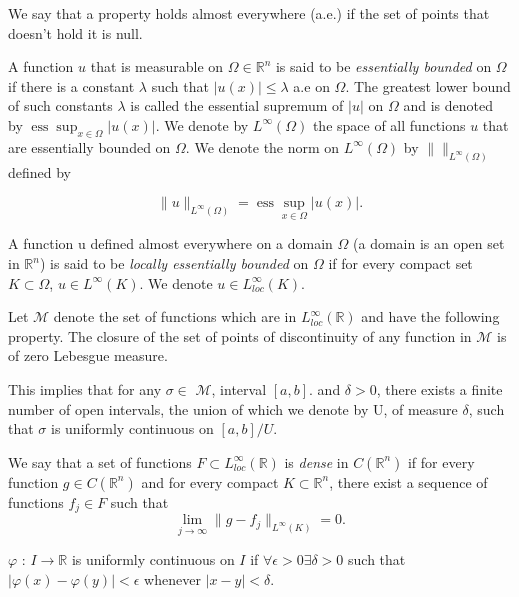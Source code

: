 \documentclass[../main.tex]{subfiles}
\begin{document}
\begin{definition}
	We say that a property holds almost everywhere (a.e.) if the set of points that doesn’t hold it is null.
\end{definition}

\begin{definition}
	A function $u$ that is measurable on  $\Omega \in \mathbb{R}^n$ is said to be \emph{essentially bounded} on $\Omega$ if there is a constant $\lambda$ such that $|u(x)|\leq \lambda$ a.e on $\Omega$.  The greatest lower bound of such constants $\lambda$ is called the essential supremum of $|u|$ on $\Omega$ and is denoted by $\operatorname{ess} \sup_{x\in \Omega} |u(x)|$. We denote by $L^{\infty}(\Omega)$ the space of all functions $u$ that are essentially bounded on $\Omega$. We denote the norm on $L^{\infty}(\Omega)$ by $\| \|_{L^{\infty}(\Omega)}$ defined by

$$	\|u\|_{L^{\infty}(\Omega)} = \operatorname{ess} \sup_{x\in \Omega} |u(x)|.$$

\end{definition}


\begin{definition}
	A function u defined almost everywhere on a domain $\Omega$ (a domain is an open set in $\mathbb{R}^n$) is said to be\emph{ locally essentially bounded }on $\Omega$ if for every compact set $K\subset \Omega$, $u\in L^{\infty}(K)$. We denote $u\in L_{loc}^{\infty}(K)$.
\end{definition}

\begin{definition} \label{setM} Let  $\mathcal{M}$ denote the set of functions which are in $L_{loc}^{\infty}(\mathbb{R})$ and have the following property. The closure of the set of points of discontinuity of any function in $\mathcal{M}$ is of zero Lebesgue measure. 
\end{definition}
\noindent This implies that for any $\sigma \in$ $\mathcal{M}$, interval $[a,b] .$ and $\delta >0$, there exists a finite number of open intervals, the union of which we denote by U, of measure $\delta$, such that $\sigma$ is uniformly continuous on $[a,b]/U$. 


\begin{definition}We say that a set of functions $F\subset L_{loc}^{\infty}(\mathbb{R})$ is \emph{dense} in $C(\mathbb{R}^n)$ if for every function $g\in C(\mathbb{R}^n)$ and for every compact $K\subset \mathbb{R}^n$, there exist a sequence of functions $f_j\in F$ such that $$\lim_{j\rightarrow\infty} \|g-f_j\|_{L^\infty(K)}=0.$$ 
\end{definition}
\begin{definition} 
	$\varphi$ : $I \rightarrow \mathbb{R}$ is uniformly continuous on $I$ if $\forall \epsilon > 0 \exists \delta >0 $ such that $|\varphi(x)- \varphi(y)| < \epsilon$ whenever $|x-y|< \delta.$
\end{definition}
\end{document}
